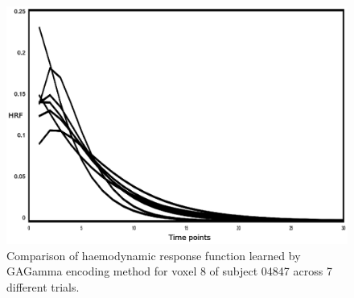 \begin{figure}
	\centering
	\includegraphics[width=\linewidth]{fig/encoding/gamma.eps}
	\caption{Comparison of haemodynamic response function learned by GAGamma encoding method for voxel 8 of subject 04847 across 7 different trials.}
	\label{fig:gamma}
\end{figure}


